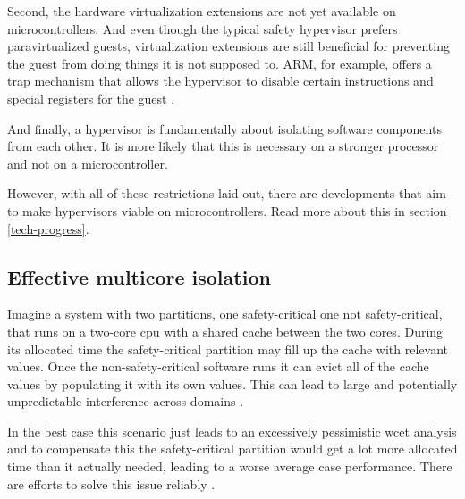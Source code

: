 Second, the hardware virtualization extensions are not yet available on microcontrollers. And even though the typical safety hypervisor prefers paravirtualized guests, virtualization extensions are still beneficial for preventing the guest from doing things it is not supposed to. ARM, for example, offers a trap mechanism that allows the hypervisor to disable certain instructions and special registers for the guest \cite{ARM.v8.2018}. 

And finally, a hypervisor is fundamentally about isolating software components from each other. It is more likely that this is necessary on a stronger processor and not on a microcontroller.

However, with all of these restrictions laid out, there are developments that aim to make hypervisors viable on microcontrollers. Read more about this in section \ref{tech-progress}.

\subsection{Effective multicore isolation}
Imagine a system with two partitions, one safety-critical one not safety-critical, that runs on a two-core \acrshort{cpu} with a shared cache between the two cores. During its allocated time the safety-critical partition may fill up the cache with relevant values. Once the non-safety-critical software runs it can evict all of the cache values by populating it with its own values. This can lead to large and potentially unpredictable interference across domains \cite{AlessandroBiondi.2018}.

In the best case this scenario just leads to an excessively pessimistic \acrfull{wcet} analysis and to compensate this the safety-critical partition would get a lot more allocated time than it actually needed, leading to a worse average case performance. There are efforts to solve this issue reliably \cite{PaoloModica.2018}.


